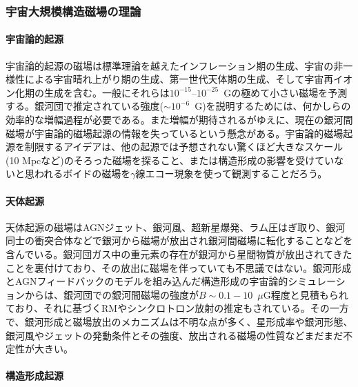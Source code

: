 \subsubsection{宇宙大規模構造磁場の理論}
\label{c06.s1.ss6.sss2}

\paragraph{宇宙論的起源}

宇宙論的起源の磁場は標準理論を越えたインフレーション期の生成\citep{2001PhR...348..163G}、宇宙の非一様性による宇宙晴れ上がり期の生成\citep{2005PhRvL..95l1301T, 2006Sci...311..827I}、第一世代天体期の生成\citep{2010ApJ...716.1566A}、そして宇宙再イオン化期の生成\citep{2000ApJ...539..505G, 2005A&A...443..367L}を含む。一般にそれらは$10^{-15}$--$10^{-25}$~Gの極めて小さい磁場を予測する。銀河団で推定されている強度($\sim 10^{-6}$~G)を説明するためには、何かしらの効率的な増幅過程が必要である。また増幅が期待されるがゆえに、現在の銀河間磁場が宇宙論的磁場起源の情報を失っているという懸念がある。宇宙論的磁場起源を制限するアイデアは、他の起源では予想されない驚くほど大きなスケール(10 Mpcなど)のそろった磁場を探ること、または構造形成の影響を受けていないと思われるボイドの磁場を$\gamma$線エコー現象\citep{Ichiki07,2008ApJ...687L...5T, 2010Sci...328...73N}を使って観測することだろう。

\paragraph{天体起源}

天体起源の磁場はAGNジェット、銀河風、超新星爆発、ラム圧はぎ取り、銀河同士の衝突合体などで銀河から磁場が放出され銀河間磁場に転化することなどを含んでいる。銀河団ガス中の重元素の存在が銀河から星間物質が放出されてきたことを裏付けており、その放出に磁場を伴っていても不思議ではない。銀河形成とAGNフィードバックのモデルを組み込んだ構造形成の宇宙論的シミュレーションからは、銀河団での銀河間磁場の強度が$B\sim 0.1-10$~$\mu$G程度と見積もられており\citep{2009MNRAS.392.1008D, 2009ApJ...698L..14X}、それに基づくRMやシンクロトロン放射の推定もされている\citep{2012ApJ...759...40X, 2013A&A...554A.102G}。その一方で、銀河形成と磁場放出のメカニズムは不明な点が多く、星形成率や銀河形態、銀河風やジェットの発動条件とその強度、放出される磁場の性質などまだまだ不定性が大きい。

\paragraph{構造形成起源}

